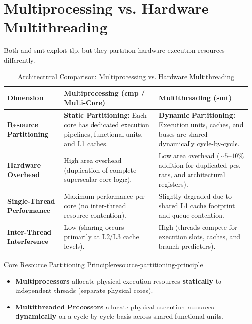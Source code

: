\section{Multiprocessing vs. Hardware Multithreading}
\label{sec:multiprocessing_vs_multithreading}

Both  and \gls{smt} exploit \gls{tlp}, but they partition hardware execution resources differently.

\begin{table}[htbp]
\centering
\caption{Architectural Comparison: Multiprocessing vs. Hardware Multithreading}
\label{tab:cmp_vs_smt}
\small
\setlength{\tabcolsep}{6pt}
\begin{tabularx}{\textwidth}{|>{\hsize=0.8\hsize\raggedright\arraybackslash}X|>{\hsize=1.1\hsize\raggedright\arraybackslash}X|>{\hsize=1.1\hsize\raggedright\arraybackslash}X|}
\hline
\textbf{Dimension} & \textbf{Multiprocessing (\gls{cmp} / Multi-Core)} & \textbf{Multithreading (\gls{smt})} \\ \hline
\textbf{Resource Partitioning} & \textbf{Static Partitioning:} Each core has dedicated execution pipelines, functional units, and L1 caches. & \textbf{Dynamic Partitioning:} Execution units, caches, and buses are shared dynamically cycle-by-cycle. \\ \hline
\textbf{Hardware Overhead} & High area overhead (duplication of complete superscalar core logic). & Low area overhead ($\sim 5\text{--}10\%$ addition for duplicated \glspl{pc}, \glspl{rat}, and architectural registers). \\ \hline
\textbf{Single-Thread Performance} & Maximum performance per core (no inter-thread resource contention). & Slightly degraded due to shared L1 cache footprint and queue contention. \\ \hline
\textbf{Inter-Thread Interference} & Low (sharing occurs primarily at L2/L3 cache levels). & High (threads compete for execution slots, caches, and branch predictors). \\ \hline
\end{tabularx}
\end{table}

\begin{concept}{Core Resource Partitioning Principle}{resource-partitioning-principle}
    \begin{itemize}
        \item \textbf{Multiprocessors} allocate physical execution resources \textbf{statically} to independent threads (separate physical cores).
        \item \textbf{Multithreaded Processors} allocate physical execution resources \textbf{dynamically} on a cycle-by-cycle basis across shared functional units.
    \end{itemize}
\end{concept}

